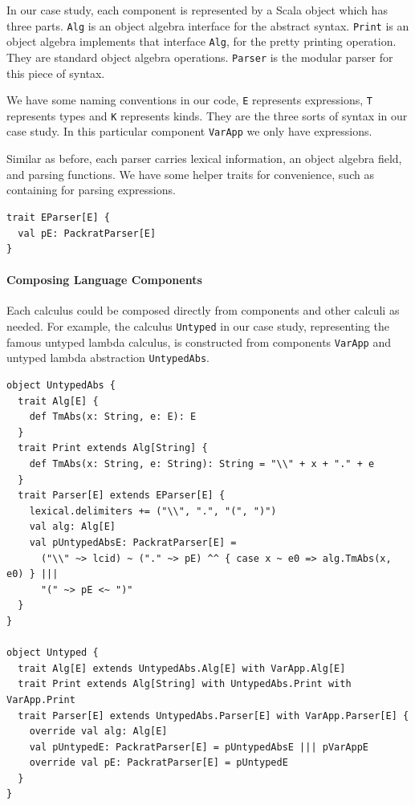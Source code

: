 In our case study, each component is represented by a Scala object which has three parts.
\lstinline{Alg} is an object algebra interface for the abstract syntax.
\lstinline{Print} is an object algebra implements that interface
\lstinline{Alg}, for the pretty printing operation. They are standard object algebra operations.
\lstinline{Parser} is the modular parser for this piece of syntax.

We have some naming conventions in our code, \lstinline{E} represents
expressions, \lstinline{T} represents types and \lstinline{K}
represents kinds. They are the three sorts of syntax in our case study.
In this particular component \lstinline{VarApp} we only have expressions.

Similar as before, each parser carries lexical information, an object algebra field, and
parsing functions. We have some helper traits for convenience, such as 
containing  for parsing expressions.

\begin{lstlisting}
trait EParser[E] {
  val pE: PackratParser[E]
}
\end{lstlisting}

\paragraph{Composing Language Components}
Each calculus could be composed directly from components and other
calculi as needed. For example, the calculus \lstinline{Untyped} in our case study,
representing the famous untyped lambda calculus, is constructed from components \lstinline{VarApp}
and untyped lambda abstraction \lstinline{UntypedAbs}.

\begin{lstlisting}
object UntypedAbs {
  trait Alg[E] {
    def TmAbs(x: String, e: E): E
  }
  trait Print extends Alg[String] {
    def TmAbs(x: String, e: String): String = "\\" + x + "." + e
  }
  trait Parser[E] extends EParser[E] {
    lexical.delimiters += ("\\", ".", "(", ")")
    val alg: Alg[E]
    val pUntypedAbsE: PackratParser[E] =
      ("\\" ~> lcid) ~ ("." ~> pE) ^^ { case x ~ e0 => alg.TmAbs(x, e0) } |||
      "(" ~> pE <~ ")"
  }
}

object Untyped {
  trait Alg[E] extends UntypedAbs.Alg[E] with VarApp.Alg[E]
  trait Print extends Alg[String] with UntypedAbs.Print with VarApp.Print
  trait Parser[E] extends UntypedAbs.Parser[E] with VarApp.Parser[E] {
    override val alg: Alg[E]
    val pUntypedE: PackratParser[E] = pUntypedAbsE ||| pVarAppE
    override val pE: PackratParser[E] = pUntypedE
  }
}
\end{lstlisting}

